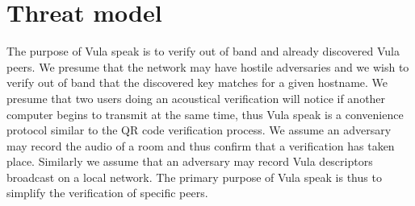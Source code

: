 \documentclass[a4paper,11pt]{report}
\begin{document}
\section{Threat model}
The purpose of Vula speak is to verify out of band and already discovered Vula peers. We presume that the network may have hostile adversaries and we wish to verify out of band that the discovered key matches for a given hostname. We presume that two users doing an acoustical verification will notice if another computer begins to transmit at the same time, thus Vula speak is a convenience protocol similar to the QR code verification process. We assume an adversary may record the audio of a room and thus confirm that a verification has taken place. Similarly we assume that an adversary may record Vula descriptors broadcast on a local network.
The primary purpose of Vula speak is thus to simplify the verification of specific peers.
\end{document}
